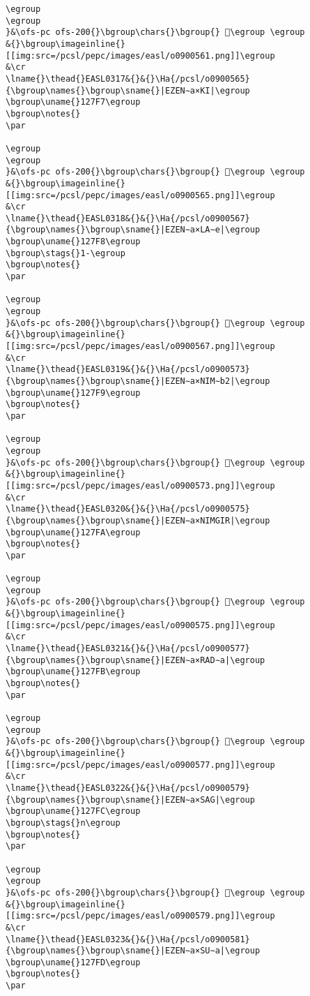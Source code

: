 \begin{verbatim}
\egroup
\egroup
}&\ofs-pc ofs-200{}\bgroup\chars{}\bgroup{} 𒟶\egroup \egroup
&{}\bgroup\imageinline{}[[img:src=/pcsl/pepc/images/easl/o0900561.png]]\egroup
&\cr
\lname{}\thead{}EASL0317&{}&{}\Ha{/pcsl/o0900565}{\bgroup\names{}\bgroup\sname{}|EZEN∼a×KI|\egroup
\bgroup\uname{}127F7\egroup
\bgroup\notes{}
\par 

\egroup
\egroup
}&\ofs-pc ofs-200{}\bgroup\chars{}\bgroup{} 𒟷\egroup \egroup
&{}\bgroup\imageinline{}[[img:src=/pcsl/pepc/images/easl/o0900565.png]]\egroup
&\cr
\lname{}\thead{}EASL0318&{}&{}\Ha{/pcsl/o0900567}{\bgroup\names{}\bgroup\sname{}|EZEN∼a×LA∼e|\egroup
\bgroup\uname{}127F8\egroup
\bgroup\stags{}1-\egroup
\bgroup\notes{}
\par 

\egroup
\egroup
}&\ofs-pc ofs-200{}\bgroup\chars{}\bgroup{} 𒟸\egroup \egroup
&{}\bgroup\imageinline{}[[img:src=/pcsl/pepc/images/easl/o0900567.png]]\egroup
&\cr
\lname{}\thead{}EASL0319&{}&{}\Ha{/pcsl/o0900573}{\bgroup\names{}\bgroup\sname{}|EZEN∼a×NIM∼b2|\egroup
\bgroup\uname{}127F9\egroup
\bgroup\notes{}
\par 

\egroup
\egroup
}&\ofs-pc ofs-200{}\bgroup\chars{}\bgroup{} 𒟹\egroup \egroup
&{}\bgroup\imageinline{}[[img:src=/pcsl/pepc/images/easl/o0900573.png]]\egroup
&\cr
\lname{}\thead{}EASL0320&{}&{}\Ha{/pcsl/o0900575}{\bgroup\names{}\bgroup\sname{}|EZEN∼a×NIMGIR|\egroup
\bgroup\uname{}127FA\egroup
\bgroup\notes{}
\par 

\egroup
\egroup
}&\ofs-pc ofs-200{}\bgroup\chars{}\bgroup{} 𒟺\egroup \egroup
&{}\bgroup\imageinline{}[[img:src=/pcsl/pepc/images/easl/o0900575.png]]\egroup
&\cr
\lname{}\thead{}EASL0321&{}&{}\Ha{/pcsl/o0900577}{\bgroup\names{}\bgroup\sname{}|EZEN∼a×RAD∼a|\egroup
\bgroup\uname{}127FB\egroup
\bgroup\notes{}
\par 

\egroup
\egroup
}&\ofs-pc ofs-200{}\bgroup\chars{}\bgroup{} 𒟻\egroup \egroup
&{}\bgroup\imageinline{}[[img:src=/pcsl/pepc/images/easl/o0900577.png]]\egroup
&\cr
\lname{}\thead{}EASL0322&{}&{}\Ha{/pcsl/o0900579}{\bgroup\names{}\bgroup\sname{}|EZEN∼a×SAG|\egroup
\bgroup\uname{}127FC\egroup
\bgroup\stags{}n\egroup
\bgroup\notes{}
\par 

\egroup
\egroup
}&\ofs-pc ofs-200{}\bgroup\chars{}\bgroup{} 𒟼\egroup \egroup
&{}\bgroup\imageinline{}[[img:src=/pcsl/pepc/images/easl/o0900579.png]]\egroup
&\cr
\lname{}\thead{}EASL0323&{}&{}\Ha{/pcsl/o0900581}{\bgroup\names{}\bgroup\sname{}|EZEN∼a×SU∼a|\egroup
\bgroup\uname{}127FD\egroup
\bgroup\notes{}
\par 


\end{verbatim}
